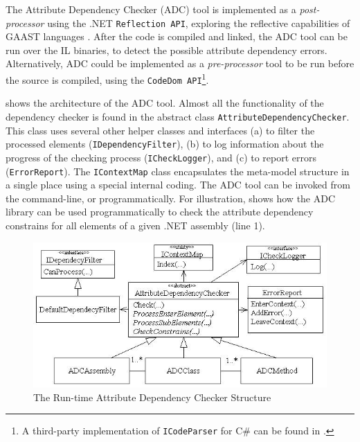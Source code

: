 The Attribute Dependency Checker (ADC) tool is implemented as a \textit{post-processor} using the .NET \texttt{Reflection API}, exploring the reflective capabilities of GAAST languages . After the code is compiled and linked, the ADC tool can be run over the IL binaries, to detect the possible attribute dependency errors. Alternatively, ADC could be implemented as a \textit{pre-processor} tool to be run before the source is compiled, using the \texttt{Code\-Dom API}\footnote{A third-party implementation of \texttt{ICo\-de\-Pa\-rser} for C\# can be found in \cite{cs.codedom.parser}.}.

 shows the architecture of the ADC tool. Almost all the functionality of the dependency checker is found in the abstract class \texttt{Attri\-buteDe\-pe\-nde\-ncyChe\-cker}. This class uses several other helper classes and interfaces (a) to  filter the processed elements (\texttt{IDe\-pende\-ncyFi\-lter}), (b) to log information about the progress of the checking process (\texttt{IChe\-ckLo\-gger}), and (c) to report errors (\texttt{Error\-Re\-port}). The \texttt{ICo\-ntextMap} class encapsulates the meta-model structure in a single place using a special internal coding. The ADC tool can be invoked from the command-line, or programmatically. 
For illustration,  shows how the ADC library can be used programmatically to check the attribute dependency constrains for all elements of a given .NET assembly (line 1). 

\begin{figure}[ht]
	\begin{center}
		\includegraphics[width=12cm,height=!]{ch04b/implementation2}
	\end{center}
	\caption{The Run-time Attribute Dependency Checker Structure}
	\label{fig:implementation}
\end{figure}

